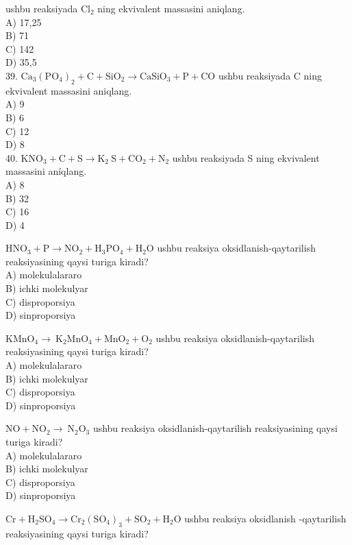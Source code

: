 ushbu reaksiyada $\mathrm{Cl}_{2}$ ning ekvivalent massasini aniqlang.\\
A) 17,25\\
B) 71\\
C) 142\\
D) 35,5\\
39. $\mathrm{Ca}_{3}\left(\mathrm{PO}_{4}\right)_{2}+\mathrm{C}+\mathrm{SiO}_{2} \rightarrow \mathrm{CaSiO}_{3}+\mathrm{P}+\mathrm{CO}$ ushbu reaksiyada C ning ekvivalent massasini aniqlang.\\
A) 9\\
B) 6\\
C) 12\\
D) 8\\
40. $\mathrm{KNO}_{3}+\mathrm{C}+\mathrm{S} \rightarrow \mathrm{K}_{2} \mathrm{~S}+\mathrm{CO}_{2}+\mathrm{N}_{2}$ ushbu reaksiyada S ning ekvivalent massasini aníqlang.\\
A) 8\\
B) 32\\
C) 16\\
D) 4
  \item $\mathrm{HNO}_{3}+\mathrm{P} \rightarrow \mathrm{NO}_{2}+\mathrm{H}_{3} \mathrm{PO}_{4}+\mathrm{H}_{2} \mathrm{O}$ ushbu reaksiya oksidlanish-qaytarilish reaksiyasining qaysi turiga kiradi?\\
A) molekulalararo\\
B) ichki molekulyar\\
C) disproporsiya\\
D) sinproporsiya\\
  \item $\mathrm{KMnO}_{4} \rightarrow \mathrm{~K}_{2} \mathrm{MnO}_{4}+\mathrm{MnO}_{2}+\mathrm{O}_{2}$ ushbu reaksiya oksidlanish-qaytarilish reaksiyasining qaysi turiga kiradi?\\
A) molekulalararo\\
B) ichki molekulyar\\
C) disproporsiya\\
D) sinproporsiya
  \item $\mathrm{NO}+\mathrm{NO}_{2} \rightarrow \mathrm{~N}_{2} \mathrm{O}_{3}$ ushbu reaksiya oksidlanish-qaytarilish reaksiyasining qaysi turiga kiradi?\\
A) molekulalararo\\
B) ichki molekulyar\\
C) disproporsiya\\
D) sinproporsiya
  \item $\mathrm{Cr}+\mathrm{H}_{2} \mathrm{SO}_{4} \rightarrow \mathrm{Cr}_{2}\left(\mathrm{SO}_{4}\right)_{3}+\mathrm{SO}_{2}+\mathrm{H}_{2} \mathrm{O}$ ushbu reaksiya oksidlanish -qaytarilish reaksiyasining qaysi turiga kiradi?\\
